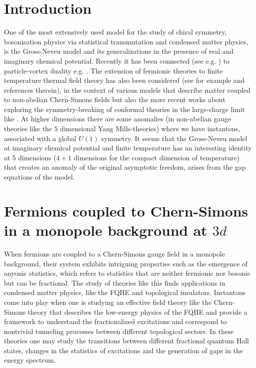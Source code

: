 \documentclass[twoside]{article}
\begin{document}
\section{Introduction}
One of the most extensively used model for the study of chiral symmetry, bosonisation physics \cite{Fradkin:1994tt} via  statistical transmutation \cite{Wilczek:1981du,Polyakov:1988md} and condensed matter physics, is the Gross-Neveu model and its generalizations in the presence of real and imaginary chemical potential. Recently it has been connected (see e.g. \cite{Karch:2016sxi,Murugan:2016zal,Seiberg:2016gmd,Kachru:2016rui,Meng:2020}) to particle-vortex duality e.g. \cite{Peskin:1977kp}. The extension of fermionic theories to finite temperature thermal field theory has also been considered (see  for example \cite{Giombi:2011kc,Aharony:2012ns} and references therein), in the context  of various models that describe matter coupled to non-abelian Chern-Simons fields but also the more recent works about exploring the symmetry-breaking of conformal theories in the large-charge limit like \cite{Alvarez}. At higher dimensions \cite{Genolini, Gaiotto} there are some anomalies (in non-abelian gauge theories like the $5$ dimensional Yang Mills-theories) where we have instantons, associated with a global $U(1)$ symmetry. It seems that the Gross-Neveu model at imaginary chemical potential and finite temperature has an interesting identity at $5$ dimensions ($4+1$ dimensions for the compact dimension of temperature) that creates an anomaly of the original asymptotic freedom, arises from the gap equations of the model.


\section{Fermions coupled to Chern-Simons in a monopole background at $3d$}

When fermions are coupled to a Chern-Simons gauge field in a monopole background, their system exhibits intriguing properties such as the emergence of anyonic statistics, which refers to statistics that are neither fermionic nor bosonic but can be fractional. The study of theories like this finds applications in condensed matter physics, like the FQHE and topological insulators. Instantons \cite{DiVecchia} come into play when one is studying an effective field theory like the Chern-Simons theory that describes the low-energy physics of the FQHE and provide a framework to understand the fractionalized excitations and correspond to nontrivial tunneling processes between different topological sectors. In these theories one may study the transitions between different fractional quantum Hall states, changes in the statistics of excitations and the generation of gaps in the energy spectrum.
\end{document}
